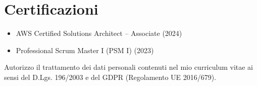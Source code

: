 \documentclass[10pt,a4paper]{article}
\begin{document}
\begin{minipage}[t]{0.33\textwidth}
  \vspace{1.0em}

  \section*{Certificazioni}
  \begin{itemize}[leftmargin=*,noitemsep]
    \item AWS Certified Solutions Architect -- Associate (2024)
    \item Professional Scrum Master I (PSM I) (2023)
  \end{itemize}

\end{minipage}

\vfill
\begin{center}
  \color{lighttext}\scriptsize
  Autorizzo il trattamento dei dati personali contenuti nel mio curriculum vitae ai sensi del D.Lgs. 196/2003 e del GDPR (Regolamento UE 2016/679).
\end{center}
\end{document}
